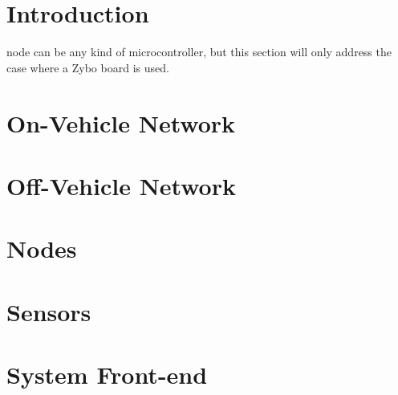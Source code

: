 \section{Introduction}
 node can be any kind of microcontroller, but this section will only address the case where a Zybo board is used. 

\section{On-Vehicle Network}






\section{Off-Vehicle Network}

\section{Nodes}

\section{Sensors}

\section{System Front-end}
